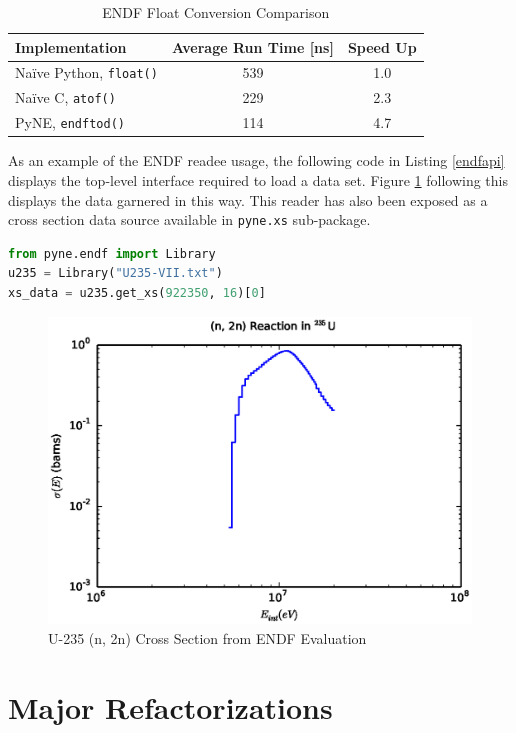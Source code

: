 \documentclass{ansconf}
\begin{document}
\begin{table}
\caption{ENDF Float Conversion Comparison}
\label{endftod}
\begin{center}
\begin{tabular}[htbp]{|l|c|c|}
\hline
\textbf{Implementation} & \textbf{Average Run Time [ns]} & \textbf{Speed Up} \\
\hline
Na\"{i}ve Python, \texttt{float()} & 539 & 1.0 \\
\hline
Na\"{i}ve C, \texttt{atof()} & 229 & 2.3 \\
\hline
PyNE, \texttt{endftod()} & 114 & 4.7 \\
\hline
\end{tabular}
\end{center}
\end{table}

As an example of the ENDF readee usage, the following code in Listing \ref{endfapi} 
displays the top-level interface required to load a data set.  Figure \ref{u235} 
following this displays the data garnered in this way.  This reader has also
been exposed as a cross section data source available in \texttt{pyne.xs} 
sub-package.

\begin{lstlisting}[language=Python,frame=single,caption=ENDF Reader API,label=endfapi]
from pyne.endf import Library
u235 = Library("U235-VII.txt")
xs_data = u235.get_xs(922350, 16)[0]
\end{lstlisting}

\begin{figure}[htbp]
\begin{center}
\includegraphics{u235_2n.eps}
\end{center}
\caption{U-235 (n, 2n) Cross Section from ENDF Evaluation}
\label{u235}
\end{figure}

\section{Major Refactorizations}



\end{document}
